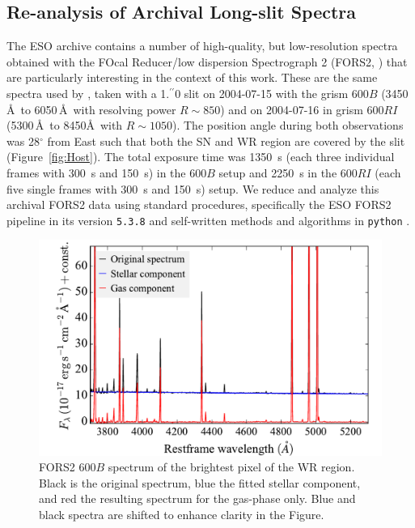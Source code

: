 \documentclass[traditabstract]{aa}
\newcommand{\farc}{\hbox{$.\!\!^{\prime\prime}$}}
\begin{document}


\begin{appendix}

\section{Re-analysis of Archival Long-slit Spectra}
\label{app:fors}

The ESO archive contains a number of high-quality, but low-resolution spectra obtained with the FOcal Reducer/low dispersion Spectrograph 2 (FORS2, \citealt{1998Msngr..94....1A}) that are particularly interesting in the context of this work. These are the same spectra used by \citet{2006A&A...454..103H}, taken with a 1\farc{0} slit on 2004-07-15 with the grism 600$B$ (3450\,\AA\, to 6050\,\AA\, with resolving power $R\sim850$) and on 2004-07-16 in grism 600$RI$ (5300\,\AA\, to 8450\AA\, with $R\sim1050$). The position angle during both observations was 28$^\circ$ from East such that both the SN and WR region are covered by the slit (Figure~\ref{fig:Host}). The total exposure time was 1350~s (each three individual frames with 300~s and 150~s) in the 600$B$ setup and 2250~s in the 600$RI$ (each five single frames with 300~s and 150~s) setup. We reduce and analyze this archival FORS2 data using standard procedures, specifically the ESO FORS2 pipeline in its version \texttt{5.3.8} and self-written methods and algorithms in \texttt{python} \citep{2015A&A...581A.125K}.

\begin{figure}
\includegraphics[angle=0, width=0.9\columnwidth]{Figs/FORS2_3700_5301_starlight.pdf}
\caption{FORS2 600$B$ spectrum of the brightest pixel of the WR region. Black is the original spectrum, blue the fitted stellar component, and red the resulting spectrum for the gas-phase only. Blue and black spectra are shifted to enhance clarity in the Figure.}
\label{fig:FORSWR}
\end{figure}


\end{appendix}
\end{document}
